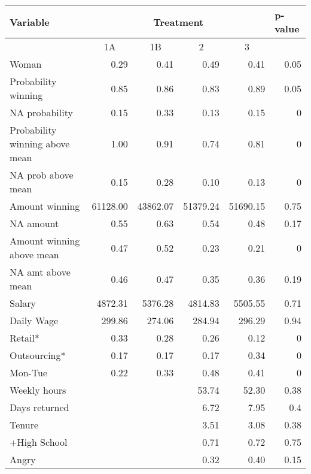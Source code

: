 \begin{tabular}{lrrrrc}
\toprule
Variable & \multicolumn{4}{c}{Treatment} & \multicolumn{1}{l}{p-value} \\
\midrule
\midrule
      & \multicolumn{1}{c}{1A} & \multicolumn{1}{c}{1B} & \multicolumn{1}{c}{2} & \multicolumn{1}{c}{3} &  \\
\midrule
Woman & 0.29  & 0.41  & 0.49  & 0.41  & \multicolumn{1}{r}{0.05} \\
Probability winning & 0.85  & 0.86  & 0.83  & 0.89  & \multicolumn{1}{r}{0.05} \\
NA probability & 0.15  & 0.33  & 0.13  & 0.15  & \multicolumn{1}{r}{0} \\
Probability winning above mean & 1.00  & 0.91  & 0.74  & 0.81  & \multicolumn{1}{r}{0} \\
NA prob above mean & 0.15  & 0.28  & 0.10  & 0.13  & \multicolumn{1}{r}{0} \\
Amount winning & 61128.00 & 43862.07 & 51379.24 & 51690.15 & \multicolumn{1}{r}{0.75} \\
NA amount & 0.55  & 0.63  & 0.54  & 0.48  & \multicolumn{1}{r}{0.17} \\
Amount winning above mean & 0.47  & 0.52  & 0.23  & 0.21  & \multicolumn{1}{r}{0} \\
NA amt above mean & 0.46  & 0.47  & 0.35  & 0.36  & \multicolumn{1}{r}{0.19} \\
Salary & 4872.31 & 5376.28 & 4814.83 & 5505.55 & \multicolumn{1}{r}{0.71} \\
Daily Wage & 299.86 & 274.06 & 284.94 & 296.29 & \multicolumn{1}{r}{0.94} \\
Retail* & 0.33  & 0.28  & 0.26  & 0.12  & \multicolumn{1}{r}{0} \\
Outsourcing* & 0.17  & 0.17  & 0.17  & 0.34  & \multicolumn{1}{r}{0} \\
Mon-Tue & 0.22  & 0.33  & 0.48  & 0.41  & \multicolumn{1}{r}{0} \\
Weekly hours &       &       & 53.74 & 52.30 & \multicolumn{1}{r}{0.38} \\
Days returned &       &       & 6.72  & 7.95  & \multicolumn{1}{r}{0.4} \\
Tenure &       &       & 3.51  & 3.08  & \multicolumn{1}{r}{0.38} \\
+High School &       &       & 0.71  & 0.72  & \multicolumn{1}{r}{0.75} \\
Angry &       &       & 0.32  & 0.40  & \multicolumn{1}{r}{0.15} \\

\end{tabular}
